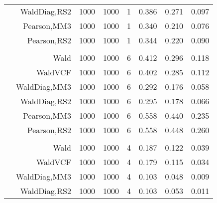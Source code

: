 \documentclass[
]{article}
\begin{document}
\begin{table}[H]
{\begin{tabular}[t]{lrrrrrrr}
\hspace{1em} & WaldDiag,RS2 & 1000 & 1000 & 1 & 0.386 & 0.271 & 0.097\\

\hspace{1em} & Pearson,MM3 & 1000 & 1000 & 1 & 0.340 & 0.210 & 0.076\\

\hspace{1em} & Pearson,RS2 & 1000 & 1000 & 1 & 0.344 & 0.220 & 0.090\\
\cmidrule{1-8}
\addlinespace[0.3em]
\multicolumn{8}{l}{\textbf{1F 15V}}\\
\hspace{1em} & Wald & 1000 & 1000 & 6 & 0.412 & 0.296 & 0.118\\

\hspace{1em} & WaldVCF & 1000 & 1000 & 6 & 0.402 & 0.285 & 0.112\\

\hspace{1em} & WaldDiag,MM3 & 1000 & 1000 & 6 & 0.292 & 0.176 & 0.058\\

\hspace{1em} & WaldDiag,RS2 & 1000 & 1000 & 6 & 0.295 & 0.178 & 0.066\\

\hspace{1em} & Pearson,MM3 & 1000 & 1000 & 6 & 0.558 & 0.440 & 0.235\\

\hspace{1em} & Pearson,RS2 & 1000 & 1000 & 6 & 0.558 & 0.448 & 0.260\\
\cmidrule{1-8}
\addlinespace[0.3em]
\multicolumn{8}{l}{\textbf{2F 10V}}\\
\hspace{1em} & Wald & 1000 & 1000 & 4 & 0.187 & 0.122 & 0.039\\

\hspace{1em} & WaldVCF & 1000 & 1000 & 4 & 0.179 & 0.115 & 0.034\\

\hspace{1em} & WaldDiag,MM3 & 1000 & 1000 & 4 & 0.103 & 0.048 & 0.009\\

\hspace{1em} & WaldDiag,RS2 & 1000 & 1000 & 4 & 0.103 & 0.053 & 0.011\\


\end{tabular}}
\end{table}
\end{document}
